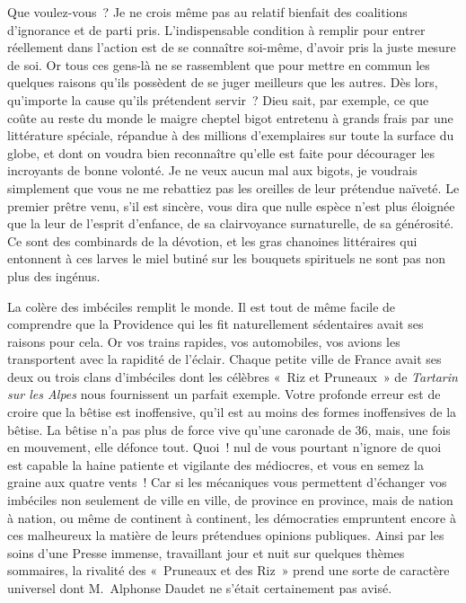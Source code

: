 \documentclass[french,twoside]{book} %
\begin{document}
Que voulez-vous ? Je ne crois même pas au relatif bienfait des coalitions d’ignorance et de parti pris. L’indispensable condition à remplir pour entrer réellement dans l’action est de se connaître soi-même, d’avoir pris la juste mesure de soi. Or tous ces gens-là ne se rassemblent que pour mettre en commun les quelques raisons qu’ils possèdent de se juger meilleurs que les autres. Dès lors, qu’importe la cause qu’ils prétendent servir ? Dieu sait, par exemple, ce que coûte au reste du monde le maigre cheptel bigot entretenu à grands frais par une littérature spéciale, répandue à des millions d’exemplaires sur toute la surface du globe, et dont on voudra bien reconnaître qu’elle est faite pour décourager les incroyants de bonne volonté. Je ne veux aucun mal aux bigots, je voudrais simplement que vous ne me rebattiez pas les oreilles de leur prétendue naïveté. Le premier prêtre venu, s’il est sincère, vous dira que nulle espèce n’est plus éloignée que la leur de l’esprit d’enfance, de sa clairvoyance surnaturelle, de sa générosité. Ce sont des combinards de la dévotion, et les gras chanoines littéraires qui entonnent à ces larves le miel butiné sur les bouquets spirituels ne sont pas non plus des ingénus.\par
La colère des imbéciles remplit le monde. Il est tout de même facile de comprendre que la Providence qui les fit naturellement sédentaires avait ses raisons pour cela. Or vos trains rapides, vos automobiles, vos avions les transportent avec la rapidité de l’éclair. Chaque petite ville de France avait ses deux ou trois clans d’imbéciles dont les célèbres « Riz et Pruneaux » de \emph{Tartarin sur les Alpes} nous fournissent un parfait exemple. Votre profonde erreur est de croire que la bêtise est inoffensive, qu’il est au moins des formes inoffensives de la bêtise. La bêtise n’a pas plus de force vive qu’une caronade de 36, mais, une fois en mouvement, elle défonce tout. Quoi ! nul de vous pourtant n’ignore de quoi est capable la haine patiente et vigilante des médiocres, et vous en semez la graine aux quatre vents ! Car si les mécaniques vous permettent d’échanger vos imbéciles non seulement de ville en ville, de province en province, mais de nation à nation, ou même de continent à continent, les démocraties empruntent encore à ces malheureux la matière de leurs prétendues opinions publiques. Ainsi par les soins d’une Presse immense, travaillant jour et nuit sur quelques thèmes sommaires, la rivalité des « Pruneaux et des Riz » prend une sorte de caractère universel dont M. Alphonse Daudet ne s’était certainement pas avisé.\par
\end{document}
